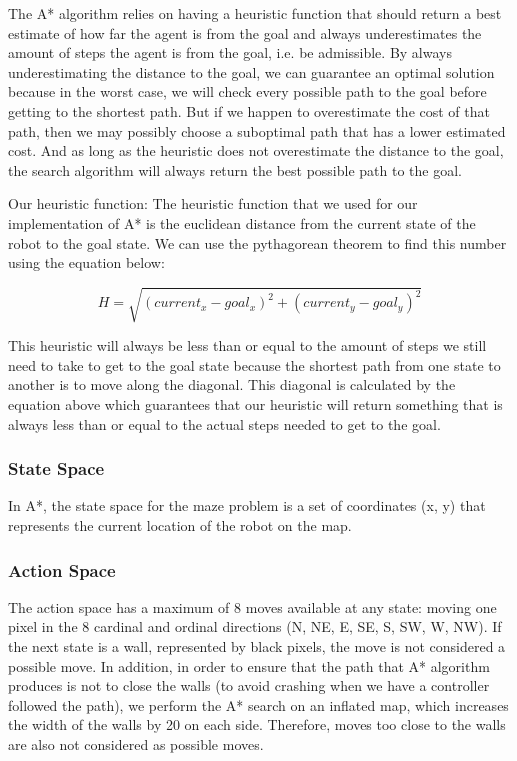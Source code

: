 \documentclass[11pt]{article}
\begin{document}
    The A* algorithm relies on having a heuristic function that should return a best estimate of how far the agent is from the goal and always underestimates the amount of steps the agent is from the goal, i.e. be admissible. By always underestimating the distance to the goal, we can guarantee an optimal solution because in the worst case, we will check every possible path to the goal before getting to the shortest path. But if we happen to overestimate the cost of that path, then we may possibly choose a suboptimal path that has a lower estimated cost.  And as long as the heuristic does not overestimate the distance to the goal, the search algorithm will always return the best possible path to the goal. 
    
    Our heuristic function: The heuristic function that we used for our implementation of A* is the euclidean distance from the current state of the robot to the goal state. We can use the pythagorean theorem to find this number using the equation below: 

    \[ H = \sqrt{(current_x-goal_x)^2 + (current_y - goal_y)^2}\]

    This heuristic will always be less than or equal to the amount of steps we
    still need to take to get to the goal state because the shortest path from
    one state to another is to move along the diagonal. This diagonal is
    calculated by the equation above which guarantees that our heuristic will
    return something that is always less than or equal to the actual steps
    needed to get to the goal. 

        \subsubsection{State Space}

        In A*, the state space for the maze problem is a set of coordinates (x, y) that represents the current location of the robot on the map. 

        \subsubsection{Action Space}

        The action space has a maximum of 8 moves available at any state: moving
        one pixel in the 8 cardinal and ordinal directions (N, NE, E, SE, S, SW,
        W, NW). If the next state is a wall, represented by black pixels, the
        move is not considered a possible move. In addition, in order to ensure
        that the path that A* algorithm produces is not to close the walls (to
        avoid crashing when we have a controller followed the path), we perform
        the A* search on an inflated map, which increases the width of the walls
        by 20 on each side. Therefore, moves too close to the walls are also not
        considered as possible moves. 
\end{document}
